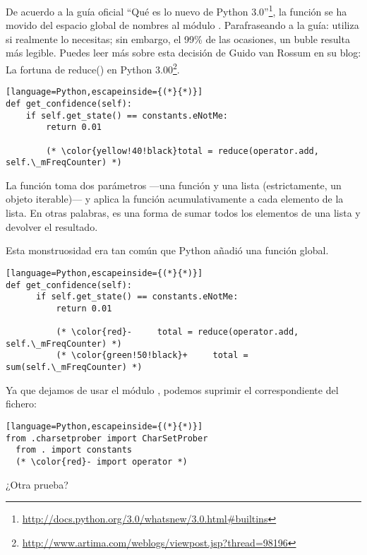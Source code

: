 De acuerdo a la guía oficial ``Qué es lo nuevo de Python 3.0''\footnote{\href{http://docs.python.org/3.0/whatsnew/3.0.html\#builtins}{http://docs.python.org/3.0/whatsnew/3.0.html\#builtins}}, la función  se ha movido del espacio global de nombres al módulo . Parafraseando a la guía: utiliza  si realmente lo necesitas; sin embargo, el 99\% de las ocasiones, un buble  resulta más legible. Puedes leer más sobre esta decisión de Guido van Rossum en su blog: La fortuna de reduce() en Python 3.00\footnote{\href{http://www.artima.com/weblogs/viewpost.jsp?thread=98196}{http://www.artima.com/weblogs/viewpost.jsp?thread=98196}}.


\begin{lstlisting}[language=Python,escapeinside={(*}{*)}]
def get_confidence(self):
    if self.get_state() == constants.eNotMe:
        return 0.01
  
        (* \color{yellow!40!black}total = reduce(operator.add, self.\_mFreqCounter) *)
\end{lstlisting}

La función  toma dos parámetros ---una función y una lista (estrictamente, un objeto iterable)--- y aplica la función acumulativamente a cada elemento de la lista. En otras palabras, es una forma de sumar todos los elementos de una lista y devolver el resultado.

Esta monstruosidad era tan común que Python añadió una función  global.


\begin{lstlisting}[language=Python,escapeinside={(*}{*)}]
def get_confidence(self):
      if self.get_state() == constants.eNotMe:
          return 0.01

          (* \color{red}-     total = reduce(operator.add, self.\_mFreqCounter) *)
          (* \color{green!50!black}+     total = sum(self.\_mFreqCounter) *)
\end{lstlisting}

Ya que dejamos de usar el módulo , podemos suprimir el  correspondiente del fichero:


\begin{lstlisting}[language=Python,escapeinside={(*}{*)}]
from .charsetprober import CharSetProber
  from . import constants
  (* \color{red}- import operator *)
\end{lstlisting}

¿Otra prueba?

